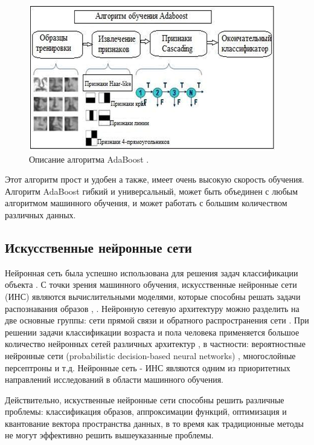 \begin{figure}[ht!]
\centering
\includegraphics [scale=0.8] {images/h6.png}
\begin{center}
\caption{Описание алгоритма AdaBoost \cite{Sochman2004}.} \label{img6}
\end{center}
\end{figure}

Этот алгоритм прост и удобен а также, имеет очень высокую скорость обучения.  Алгоритм AdaBoost гибкий и универсальный, может быть объединен с любым алгоритмом машинного обучения, и может работать с большим количеством различных данных.

\subsection{Искусственные нейронные сети}

Нейронная сеть была успешно использована для решения задач классификации объекта \cite{Hinton2012}. С точки зрения машинного обучения, искусственные нейронные сети (ИНС) являются вычислительными моделями, которые способны решать задачи распознавания образов \cite{Sergios2006}, \cite{Dunne2007}. Нейронную сетевую архитектуру можно разделить на две основные группы: сети прямой связи \cite{Colin2000} и обратного распространения сети \cite{Kamruzzaman2006}. При решении задачи классификации возраста и пола человека применяется большое количество нейронных сетей различных архитектур \cite{Rowley1998}, в частности: вероятностные нейронные сети (probabilistic decision-based neural networks) \cite{Lin1997}, многослойные персептроны \cite{Juell1996} и т.д. Нейронные сеть - ИНС являются одним из приоритетных направлений исследований в области машинного обучения.

Действительно, искуственные нейронные сети способны решить различные проблемы: классификация образов, аппроксимации функций, оптимизация и квантование вектора пространства данных, в то время как традиционные методы не могут эффективно решить вышеуказанные проблемы.

